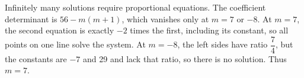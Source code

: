 Infinitely many solutions require proportional equations. The coefficient determinant is $56-m(m+1)$, which vanishes only at $m=7$ or $-8$. At $m=7$, the second equation is exactly $-2$ times the first, including its constant, so all points on one line solve the system. At $m=-8$, the left sides have ratio $\dfrac{7}{4}$, but the constants are $-7$ and 29 and lack that ratio, so there is no solution. Thus $\boxed{m=7}$.
